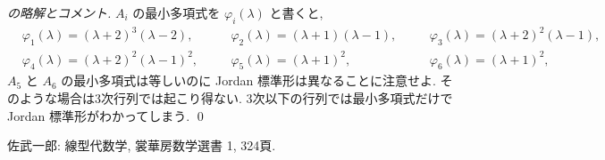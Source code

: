 \documentclass[12pt,twoside]{jarticle}
\begin{document}
\begin{proof}[\protect{[158]}の略解とコメント]
\medskip{}
$A_i$ の最小多項式を $\varphi_i(\lambda)$ と書くと,
{\small
\begin{alignat*}{3}
  &
  \varphi_1(\lambda) = (\lambda+2)^3(\lambda-2),
  & \quad &
  \varphi_2(\lambda) = (\lambda+1)(\lambda-1),
  & \quad &
  \varphi_3(\lambda) = (\lambda+2)^2(\lambda-1),
  \\ &
  \varphi_4(\lambda) = (\lambda+2)^2(\lambda-1)^2,
  & \quad &
  \varphi_5(\lambda) = (\lambda+1)^2,
  & \quad &
  \varphi_6(\lambda) = (\lambda+1)^2,
\end{alignat*}
}$A_5$ と $A_6$ の最小多項式は等しいのに Jordan 標準形は異なることに注意せよ.
そのような場合は3次行列では起こり得ない. 3次以下の行列では最小多項式だけで 
Jordan 標準形がわかってしまう.
\qed
\end{proof}


\begin{thebibliography}{ABC}

 佐武一郎: 線型代数学, 裳華房数学選書 1, 324頁.

\end{thebibliography}

\end{document}
